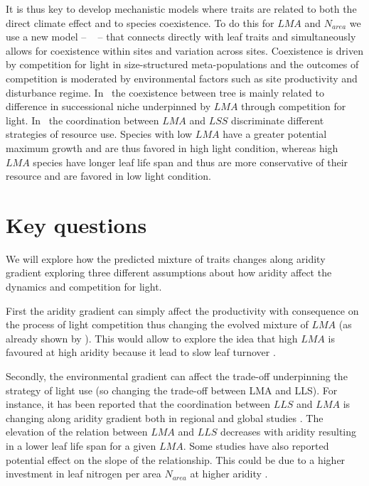 \documentclass[a4paper,11pt]{article}
\begin{document}
It is thus key to develop mechanistic models where traits are related
to both the direct climate effect and to species coexistence. To do
this for $LMA$ and $N_{area}$ we use a new model -- \plant\
\citep{Falster-2016,Falster-2017} -- that connects directly with leaf
traits and simultaneously allows for coexistence within sites and
variation across sites. Coexistence is driven by competition for light
in size-structured meta-populations and the outcomes of competition is
moderated by environmental factors such as site productivity and
disturbance regime. In \plant\ the coexistence between tree is mainly related to difference in successional niche underpinned by $LMA$ through competition for light. In \plant\ the coordination between $LMA$ and $LSS$ discriminate different strategies of resource use. Species with low $LMA$ have a greater potential maximum growth and are thus favored in high light condition, whereas high $LMA$ species have longer leaf life span and thus are more conservative of their resource and are favored in low light condition.

\section{Key questions}

We will explore how the predicted mixture of traits changes along aridity gradient exploring three different assumptions about how aridity
affect the dynamics and competition for light.

First the aridity gradient can simply affect
the productivity with consequence on the process of light
competition thus changing the evolved mixture of $LMA$ (as already shown by \citep{Falster-2017}). This would allow to explore the idea that high $LMA$ is favoured at high aridity because it lead to slow leaf turnover \citep{Wright-2002b}.


Secondly, the environmental gradient can affect the
trade-off underpinning the strategy of light use (so changing the
trade-off between LMA and LLS). For instance, it has been reported
that the coordination between $LLS$ and $LMA$ is changing along
aridity gradient both in regional \citep{Wright-2002b} and global
studies \citep{Wright-2004}. The elevation of the relation between
$LMA$ and $LLS$ decreases with aridity resulting in a lower leaf life span for a given $LMA$. Some studies have also reported potential effect on the slope of the relationship. This could be due to a higher investment in leaf nitrogen per area $N_{area}$ at higher aridity \citep{Wright-2002b}.
\end{document}
